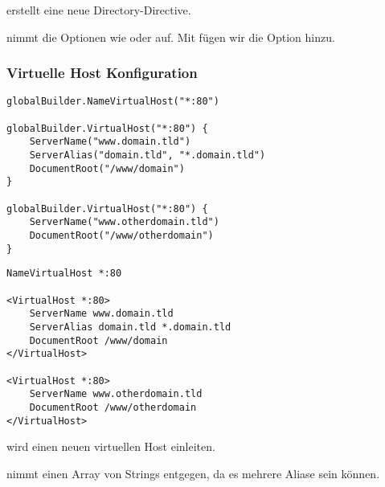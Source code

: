 erstellt eine neue Directory-Directive.

 nimmt die Optionen wie  oder 
auf. Mit  fügen wir die Option  hinzu. 

\newpage
\subsubsection{Virtuelle Host Konfiguration}

\begin{multicols}{2}
\begin{lstlisting}[style=Java, caption=Virtuel Host Httpd Script]
globalBuilder.NameVirtualHost("*:80")

globalBuilder.VirtualHost("*:80") {
    ServerName("www.domain.tld")
    ServerAlias("domain.tld", "*.domain.tld")
    DocumentRoot("/www/domain")
}

globalBuilder.VirtualHost("*:80") {
    ServerName("www.otherdomain.tld")
    DocumentRoot("/www/otherdomain")
}
\end{lstlisting}

\begin{lstlisting}[style=XML, caption=Virtual Host Configuration]
NameVirtualHost *:80

<VirtualHost *:80>
    ServerName www.domain.tld
    ServerAlias domain.tld *.domain.tld
    DocumentRoot /www/domain
</VirtualHost>

<VirtualHost *:80>
    ServerName www.otherdomain.tld
    DocumentRoot /www/otherdomain
</VirtualHost>
\end{lstlisting}
\end{multicols}

 wird einen neuen virtuellen Host
einleiten.

 nimmt einen Array von Strings entgegen, da es mehrere Aliase
sein können.

